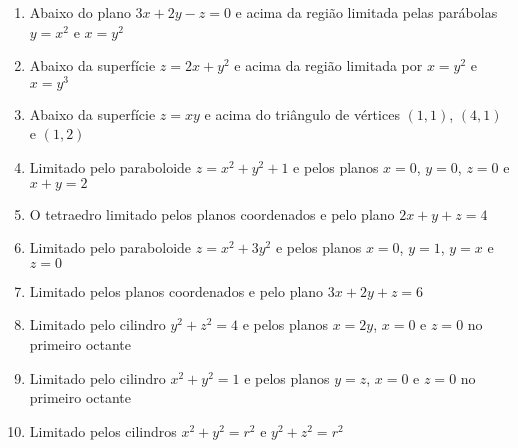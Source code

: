 \documentclass[a4paper, 12pt]{article}
\begin{document}
	\begin{enumerate}[resume]
	
		\item Abaixo do plano $3x + 2y - z = 0$ e acima da região limitada pelas parábolas $y = x^2$ e $x = y^2$
		
		\item Abaixo da superfície $z = 2x + y^2$ e acima da região limitada por $x = y^2$ e $x = y^3$
		
		\item Abaixo da superfície $z = xy$ e acima do triângulo de vértices $(1,1)$, $(4,1)$ e $(1,2)$
		
		\item Limitado pelo paraboloide $z = x^2 + y^2 + 1$ e pelos planos $x = 0$, $y = 0$, $z = 0$ e $x + y = 2$
		
		\item O tetraedro limitado pelos planos coordenados e pelo plano $2x + y + z = 4$
		
		\item Limitado pelo paraboloide $z = x^2 + 3y^2$ e pelos planos $x = 0$, $y = 1$, $y = x$ e $z = 0$
		
		\item Limitado pelos planos coordenados e pelo plano $3x + 2y + z = 6$
		
		\item Limitado pelo cilindro $y^2 + z^2 = 4$ e pelos planos $x = 2y$, $x = 0$ e $z = 0$ no primeiro octante
		
		\item Limitado pelo cilindro $x^2 + y^2 = 1$ e pelos planos $y = z$, $x = 0$ e $z = 0$ no primeiro octante
		
		\item Limitado pelos cilindros \; $x^2 + y^2 = r^2$ \; e \; $y^2 + z^2 = r^2$
	
	\end{enumerate}
			
	\vspace{5mm}	
	
\end{document}

